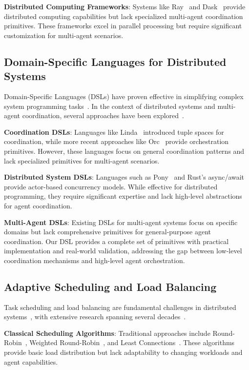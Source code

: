 \documentclass[conference]{IEEEtran}
\begin{document}
\textbf{Distributed Computing Frameworks}: Systems like Ray~\cite{ray2018} and Dask~\cite{dask2015} provide distributed computing capabilities but lack specialized multi-agent coordination primitives. These frameworks excel in parallel processing but require significant customization for multi-agent scenarios.

\subsection{Domain-Specific Languages for Distributed Systems}

Domain-Specific Languages (DSLs) have proven effective in simplifying complex system programming tasks~\cite{mernik2005domain,fowler2010domain,van2010domain}. In the context of distributed systems and multi-agent coordination, several approaches have been explored~\cite{kosar2016domain}.

\textbf{Coordination DSLs}: Languages like Linda~\cite{linda1985} introduced tuple spaces for coordination, while more recent approaches like Orc~\cite{orc2004} provide orchestration primitives. However, these languages focus on general coordination patterns and lack specialized primitives for multi-agent scenarios.

\textbf{Distributed System DSLs}: Languages such as Pony~\cite{pony2016} and Rust's async/await~\cite{rust2018} provide actor-based concurrency models. While effective for distributed programming, they require significant expertise and lack high-level abstractions for agent coordination.

\textbf{Multi-Agent DSLs}: Existing DSLs for multi-agent systems focus on specific domains but lack comprehensive primitives for general-purpose agent coordination. Our DSL provides a complete set of primitives with practical implementation and real-world validation, addressing the gap between low-level coordination mechanisms and high-level agent orchestration.

\subsection{Adaptive Scheduling and Load Balancing}

Task scheduling and load balancing are fundamental challenges in distributed systems~\cite{tanenbaum2014modern,silberschatz2018operating}, with extensive research spanning several decades~\cite{stallings2018operating,andrews2000concurrent}.

\textbf{Classical Scheduling Algorithms}: Traditional approaches include Round-Robin~\cite{roundrobin1996}, Weighted Round-Robin~\cite{wrr1998}, and Least Connections~\cite{leastconn2000}. These algorithms provide basic load distribution but lack adaptability to changing workloads and agent capabilities.
\end{document}
